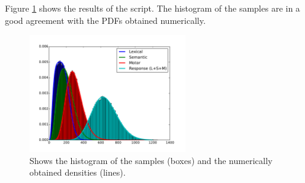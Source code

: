 Figure \ref{fig:example} shows the results of the script. The histogram of the samples are in a good agreement with the PDFs obtained numerically. 

\begin{figure}[!ht]
 \centering
 \includegraphics[width=0.6\textwidth]{fig/example.pdf}
 \caption{Shows the histogram of the samples (boxes) and the numerically obtained densities (lines).} \label{fig:example}
\end{figure}